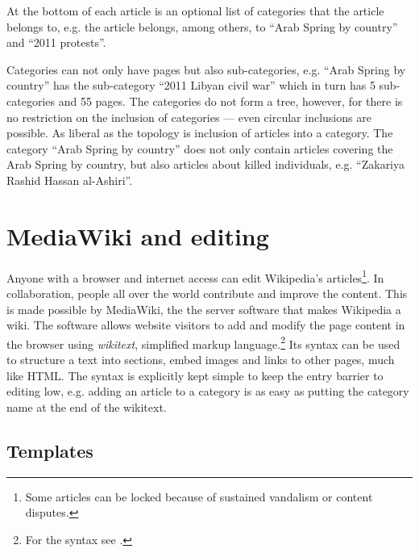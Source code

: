 At the bottom of each article is an optional list of categories that the article belongs to, e.g. the article  belongs, among others, to ``Arab Spring by country'' and ``2011 protests''.

Categories can not only have pages but also sub-categories, e.g. ``Arab Spring by country'' has the sub-category ``2011 Libyan civil war'' which in turn has 5 sub-categories and 55 pages.
The categories do not form a tree, however, for there is no restriction on the inclusion of categories --- even circular inclusions are possible.
As liberal as the topology is inclusion of articles into a category.
The category ``Arab Spring by country'' does not only contain articles covering the Arab Spring by country, but also articles about killed individuals, e.g. ``Zakariya Rashid Hassan al-Ashiri''. 

\section{MediaWiki and editing}

Anyone with a browser and internet access can edit Wikipedia's articles\footnote{Some articles can be locked because of sustained vandalism or content disputes.\cite{wpprotectionpolicy}}.
In collaboration, people all over the world contribute and improve the content. 
This is made possible by MediaWiki, the the server software that makes Wikipedia a wiki. 
The software allows website visitors to add and modify the page content in the browser using \emph{wikitext}, simplified markup language.\footnote{For the syntax see .}
Its syntax can be used to structure a text into sections, embed images and links to other pages, much like HTML.
The syntax is explicitly kept simple to keep the entry barrier to editing low, e.g. adding an article  to a category is as easy as putting the category name at the end of the wikitext.

\subsection{Templates}\label{sub:templates}

